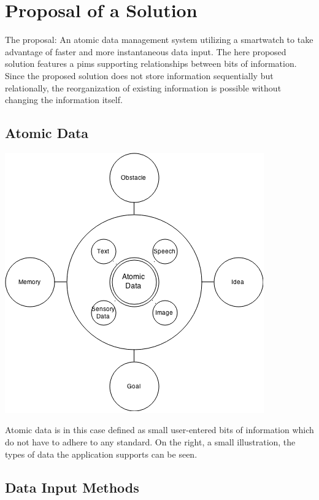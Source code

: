 \section{Proposal of a Solution}

The proposal: An atomic data management system utilizing a smartwatch to take advantage of faster and more instantaneous data input.
The here proposed solution features a \gls{pims} supporting relationships
between bits of information. Since the proposed solution does not store
information sequentially but relationally, the reorganization of existing
information is possible without changing the information itself.

\subsection{Atomic Data}

\begin{center}
\includegraphics[width=0.9\linewidth]{00_resources/atomic_data.png}
\end{center}

Atomic data is in this case defined as small user-entered bits of information which do not have to adhere to any standard.
On the right, a small illustration, the types of data the application supports can be seen.

\subsection{Data Input Methods}

